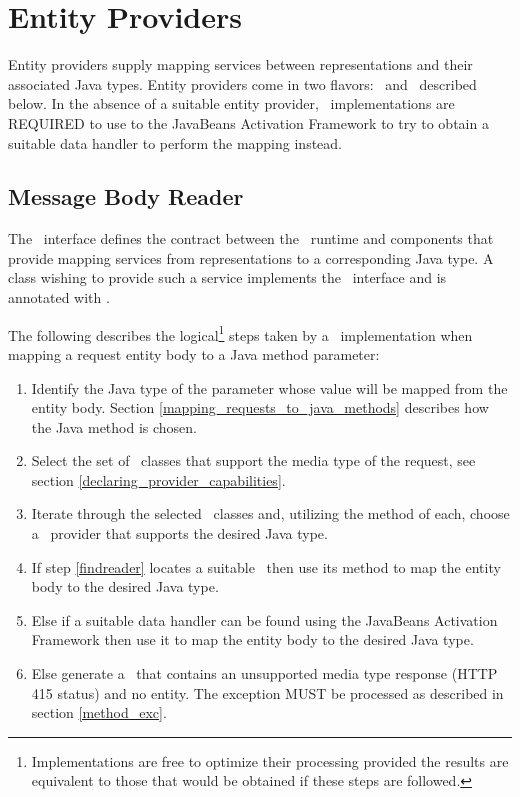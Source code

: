 \section{Entity Providers}
\label{entity_providers}

Entity providers supply mapping services between representations and their associated Java types. Entity providers come in two flavors: \MsgRead\ and \MsgWrite\ described below. In the absence of a suitable entity provider, \jaxrs\ implementations are REQUIRED to use to the JavaBeans Activation Framework\cite{jaf} to try to obtain a suitable data handler to perform the mapping instead.

\subsection{Message Body Reader}
\label{message_body_reader}

The \MsgRead\ interface defines the contract between the \jaxrs\ runtime and components that provide mapping services from representations to a corresponding Java type. A class wishing to provide such a service implements the \MsgRead\ interface and is annotated with \Provider.

The following describes the logical\footnote{Implementations are free to optimize their processing provided the results are equivalent to those that would be obtained if these steps are followed.} steps taken by a \jaxrs\ implementation when mapping a request entity body to a Java method parameter:

\begin{enumerate}
\item Identify the Java type of the parameter whose value will be mapped from the entity body. Section \ref{mapping_requests_to_java_methods} describes how the Java method is chosen.
\item Select the set of \MsgRead\ classes that support the media type of the request, see section \ref{declaring_provider_capabilities}.
\item\label{findreader} Iterate through the selected \MsgRead\ classes and, utilizing the  method of each, choose a \MsgRead\ provider that supports the desired Java type.
\item If step \ref{findreader} locates a suitable \MsgRead\ then use its  method to map the entity body to the desired Java type.
\item Else if a suitable data handler can be found using the JavaBeans Activation Framework\cite{jaf} then use it to map the entity body to the desired Java type.
\item Else generate a \WebAppExc\ that contains an unsupported media type response (HTTP 415 status) and no entity. The exception MUST be processed as described in section \ref{method_exc}.
\end{enumerate}


